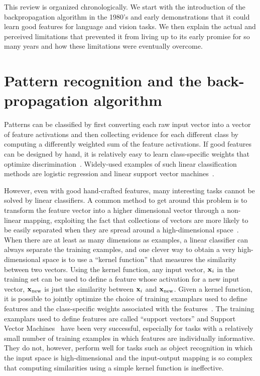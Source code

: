 \documentclass[10pts]{article}
\begin{document}
This review is organized chronologically. We start with the introduction of
the backpropagation algorithm in the 1980's and early demonstrations
that it could learn good features for language and vision tasks.  We
then explain the actual and perceived limitations that
prevented it from living up to its early promise for so many years and how
these limitations were eventually overcome. 

\section{Pattern recognition and the back-propagation algorithm}

Patterns can be classified by first converting each raw input vector into a
vector of feature activations and then collecting evidence for each
different class by computing a differently weighted sum of the feature
activations. If good
features can be designed by hand, it is relatively easy to learn
class-specific weights that optimize
discrimination~\citep{Rosenblatt57}. Widely-used examples of such linear
classification methods are logistic regression and linear support vector
machines~\citep{bishop-book95,Boser92}.

However, even with good hand-crafted features, many interesting tasks
cannot be solved by linear classifiers. A common method to get around this
problem is to transform the feature vector into a higher dimensional vector
through a non-linear mapping, exploiting the fact that collections of
vectors are more likely to be easily separated when they are spread around
a high-dimensional space~\citep{Cover65}. When there are at least
as many dimensions as examples, a linear classifier can always separate the
training examples, and one clever way to obtain a very high-dimensional space is to use a
``kernel function'' that measures the similarity between two vectors.
Using the kernel function, any input vector, ${\bf x}_i$ in the training
set can be used to define a feature whose activation for a new input
vector, ${\bf x}_{\rm new}$ is just the similarity between ${\bf x}_i$ and
${\bf x}_{\rm new}$. Given a kernel function, it is possible to jointly
optimize the choice of training examplars used to define features and the
class-specific weights associated with the features~\citep{Boser92}. The training
examplars used to define features are called ``support vectors'' and Support
Vector Machines~\citep{Boser92} have been very successful, especially for
tasks with a relatively small number of training examples in which features
are individually informative. They do not, however, perform well for tasks
such as object recognition in which the input space is high-dimensional and
the input-output mapping is so complex that computing similarities using a
simple kernel function is ineffective. 
\end{document}
